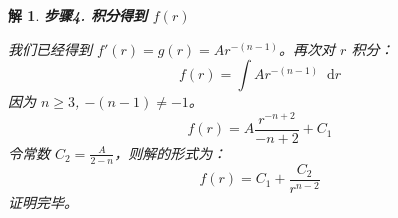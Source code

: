 \documentclass[12pt,a4paper]{article}
\newcommand{\diff}{\mathop{}\!\mathrm{d}}  %
\newtheorem*{solution}{解}
\begin{document}
\begin{solution}
		\hrulefill
		
		\textbf{步骤4. 积分得到 $f(r)$}
		
		\noindent
		我们已经得到 $f'(r) = g(r) = A r^{-(n-1)}$。再次对 $r$ 积分：
		\[ f(r) = \int A r^{-(n-1)} \diff r \]
		因为 $n \ge 3$, $-(n-1) \neq -1$。
		\[ f(r) = A \frac{r^{-n+2}}{-n+2} + C_1 \]
		令常数 $C_2 = \frac{A}{2-n}$，则解的形式为：
		\[ f(r) = C_1 + \frac{C_2}{r^{n-2}} \]
		证明完毕。
	\end{solution}
	
\end{document}
